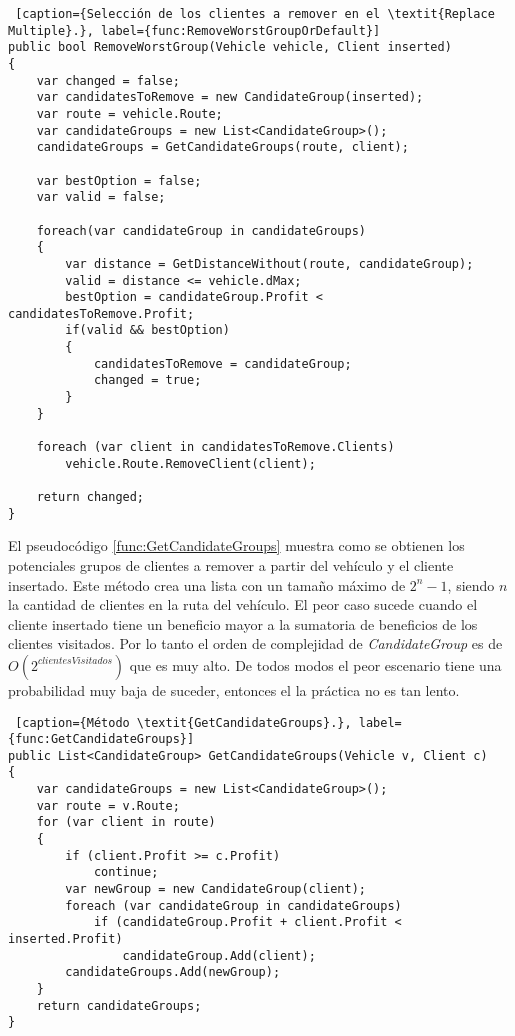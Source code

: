 \bigskip

\begin{minipage}{\textwidth}
\begin{lstlisting} [caption={Selección de los clientes a remover en el \textit{Replace Multiple}.}, label={func:RemoveWorstGroupOrDefault}]
public bool RemoveWorstGroup(Vehicle vehicle, Client inserted)
{
	var changed = false;
	var candidatesToRemove = new CandidateGroup(inserted);	
	var route = vehicle.Route;	
	var candidateGroups = new List<CandidateGroup>();
	candidateGroups = GetCandidateGroups(route, client); 	
	
	var bestOption = false;
	var valid = false;
	
	foreach(var candidateGroup in candidateGroups)
	{
		var distance = GetDistanceWithout(route, candidateGroup);
		valid = distance <= vehicle.dMax;
		bestOption = candidateGroup.Profit < candidatesToRemove.Profit;
		if(valid && bestOption)
		{
			candidatesToRemove = candidateGroup;
			changed = true;
		}
	}

	foreach (var client in candidatesToRemove.Clients)
		vehicle.Route.RemoveClient(client);

	return changed;
}
\end{lstlisting}
\end{minipage}

\bigskip

El pseudocódigo \ref{func:GetCandidateGroups} muestra como se obtienen los potenciales grupos de clientes a remover a partir del vehículo y el cliente insertado. Este método crea una lista con un tamaño máximo de $2^n-1$, siendo $n$ la cantidad de clientes en la ruta del vehículo. El peor caso sucede cuando el cliente insertado tiene un beneficio mayor a la sumatoria de beneficios de los clientes visitados. Por lo tanto el orden de complejidad de \textit{CandidateGroup} es de $O(2^{clientesVisitados})$ que es muy alto. De todos modos el peor escenario tiene una probabilidad muy baja de suceder, entonces el la práctica no es tan lento.

\bigskip

\begin{minipage}{\textwidth}
\begin{lstlisting} [caption={Método \textit{GetCandidateGroups}.}, label={func:GetCandidateGroups}]
public List<CandidateGroup> GetCandidateGroups(Vehicle v, Client c)
{
	var candidateGroups = new List<CandidateGroup>();
	var route = v.Route;
	for (var client in route)
	{
		if (client.Profit >= c.Profit)
			continue;		
		var newGroup = new CandidateGroup(client);
		foreach (var candidateGroup in candidateGroups)
			if (candidateGroup.Profit + client.Profit < inserted.Profit)
				candidateGroup.Add(client);
		candidateGroups.Add(newGroup);
	}
	return candidateGroups;
}
\end{lstlisting}
\end{minipage}

